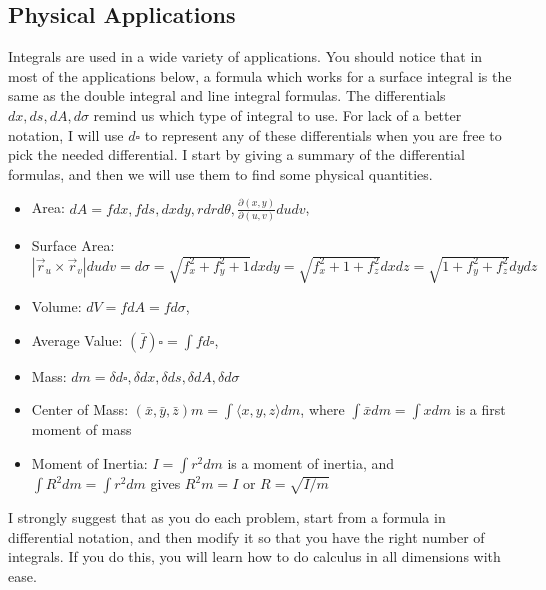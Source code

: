 \subsection{Physical Applications}
%
Integrals are used in a wide variety of applications.  You should
notice that in most of the applications below, a formula which works
for a surface integral is the same as the double integral and line
integral formulas.  The differentials $dx,ds,dA,d\sigma$ remind us which
type of integral to use.  For lack of a better notation,  I will use
$d\square$ to represent any of these differentials when you are free
to pick the needed differential. I start by giving a summary of the
differential formulas, and then we will use them to find some physical
quantities.
\begin{itemize}
\item Area: $dA = fdx,fds, dxdy, rdrd\theta, \frac{\partial(x,y)}{\partial(u,v)}dudv$, 
\item Surface Area: $|\vec r_u\times\vec r_v|dudv = d\sigma =
\sqrt{f_x^2+f_y^2+1}dxdy = \sqrt{f_x^2+1+f_z^2}dxdz =
\sqrt{1+f_y^2+f_z^2}dydz $
\item Volume: $dV = fdA = fd\sigma$, 
\item Average Value: $(\bar f)\square = \int fd\square$, 
\item Mass: $dm = \delta d\square , \delta dx, \delta ds, \delta dA, \delta d\sigma$
\item Center of Mass: $(\bar x,\bar y,\bar z)m = \int\langle x,y,z\rangle
dm$, where $\int \bar x dm = \int x dm$ is a first moment of mass
\item Moment of Inertia: $I = \int r^2 dm$ is a moment of inertia, and $\int
R^2 dm = \int r^2 dm$ gives $R^2 m =I$ or $R=\sqrt{I/m}$
\end{itemize}
I strongly suggest that as you do each problem, start from a formula
in differential notation, and then modify it so that you have the
right number of integrals.  If you do this, you will learn how to do
calculus in all dimensions with ease.



